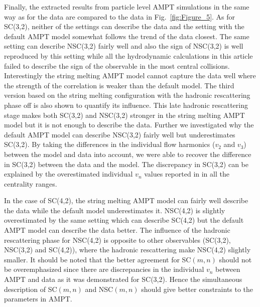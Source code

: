 \documentclass[ALICE,manyauthors]{cernphprep}
\begin{document}
Finally, the extracted results  from particle level AMPT simulations in the same way as for the data are compared to the data in Fig.~\ref{fig:Figure_5}.
As for SC(3,2), neither of the settings can describe the data and the setting with the default AMPT model somewhat follows the trend of the data closest. The same setting can describe NSC(3,2) fairly well and also the sign of NSC(3,2) is well reproduced by this setting while all the hydrodynamic calculations in this article failed to describe the sign of the observable in the most central collisions.
Interestingly the string melting AMPT model cannot capture the data well where the strength of the correlation is weaker than the default model.
The third version based on the string melting configuration with the hadronic rescattering phase off is also shown to quantify its influence.
This late hadronic rescattering stage makes both SC(3,2) and NSC(3,2) stronger in the string melting AMPT model but it is not enough to describe the data.
Further we investigated why the default AMPT model can describe NSC(3,2) fairly well but underestimates SC(3,2). By taking the differences in the individual flow harmonics ($v_2$ and $v_3$) between the model and data into account, we were able to recover the difference in SC(3,2) between the data and the model. The discrepancy in SC(3,2) can be explained by the overestimated individual $v_n$ values reported in \cite{Adam:2016nfo} in all the centrality ranges. 

In the case of SC(4,2), the string melting AMPT model can fairly well describe the data while the default model underestimates it.
NSC(4,2) is slightly overestimated by the same setting which can describe SC(4,2) but the default AMPT model can describe the data better.
The influence of the hadronic rescattering phase for NSC(4,2) is opposite to other observables (SC(3,2), NSC(3,2) and SC(4,2)), where the hadronic rescattering make NSC(4,2) slightly smaller.
It should be noted that the better agreement for SC$(m,n)$ should not be overemphasized since there are discrepancies in the individual $v_n$ between AMPT and data as it was demonstrated for SC(3,2).
Hence the simultaneous description of SC$(m,n)$ and NSC$(m,n)$ should give better constraints to the parameters in AMPT.
\end{document}

